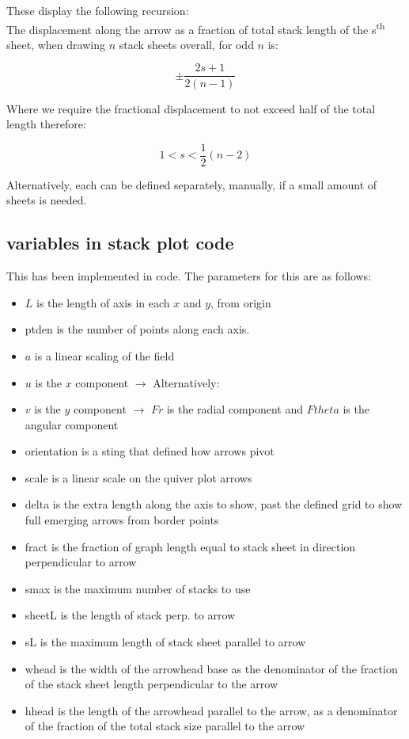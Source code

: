 \documentclass[11]{report}
\begin{document}
These display the following recursion:\\
The displacement along the arrow as a fraction of total stack length of the s\textsuperscript{th} sheet, when drawing $n$ stack sheets overall, for odd $n$ is:

\[ \pm\frac{2s+1}{2 \left( n-1 \right) } \]

Where we require the fractional displacement to not exceed half of the total length therefore:

\[ 1 < s < \frac{1}{2} \left( n-2 \right) \]

Alternatively, each can be defined separately, manually, if a small amount of sheets is needed.

\subsection{variables in stack plot code}

This has been implemented in code. The parameters for this are as follows:

\begin{itemize}

	\item $L$ is the length of axis in each $x$ and $y$, from origin
	\item pt\textunderscore den is the number of points along each axis.
	\item $a$ is a linear scaling of the field
	\item $u$ is the $x$ component  $\longrightarrow$  Alternatively:
	\item $v$ is the $y$ component $\longrightarrow$   $Fr$ is the radial component and $Ftheta$ is the angular component
	\item orientation is a sting that defined how arrows pivot
	\item scale is a linear scale on the quiver plot arrows
	\item delta is the extra length along the axis to show, past the defined grid to show full emerging arrows from border points
	\item fract is the fraction of graph length equal to stack sheet in direction perpendicular to arrow
	\item s\textunderscore max is the maximum number of stacks to use
	\item sheet\textunderscore L is the length of stack perp. to arrow
	\item s\textunderscore L is the maximum length of stack sheet parallel to arrow
	\item w\textunderscore head is the width of the arrowhead base as the denominator of the fraction of the stack sheet length perpendicular to the arrow
	\item h\textunderscore head is the length of the arrowhead parallel to the arrow, as a denominator of the fraction of the total stack size parallel to the arrow

\end{itemize}
\end{document}
